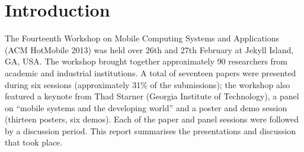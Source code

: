 \section{Introduction}
\label{sec:introduction}

The Fourteenth Workshop on Mobile Computing Systems and Applications (ACM HotMobile 
2013) was held over 26th and 27th February at Jekyll Island, GA, USA. The workshop 
brought together approximately 90 researchers from academic and industrial 
institutions. A total of seventeen papers were presented during six
sessions (approximately 31\% of the submissions); the workshop
also featured a keynote from  Thad Starner (Georgia Institute of
Technology), a panel on ``mobile systems and the developing world'' and a
poster and demo session (thirteen posters, six demos). Each of the paper and
panel sessions were followed by a discussion period. This report
summarises the
presentations and discussion that took place.
